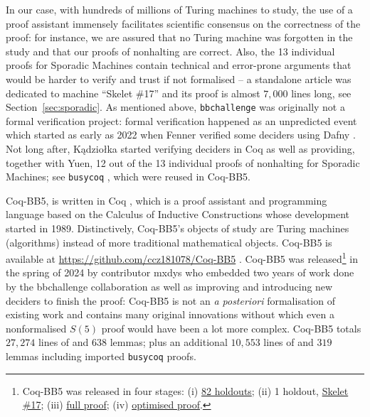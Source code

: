 \documentclass[a4paper,british]{article}
\theoremstyle{definition} %
\numberwithin{equation}{section}
\theoremstyle{definition} %
\newcommand{\CoqBB}{Coq-BB5\xspace}
\begin{document}
In our case, with hundreds of millions of Turing machines to study, the use of a proof assistant immensely facilitates scientific consensus on the correctness of the proof: for instance, we are assured that no Turing machine was forgotten in the study and that our proofs of nonhalting are correct. Also, the 13 individual proofs for Sporadic Machines contain technical and error-prone arguments that would be harder to verify and trust if not formalised -- \eg a standalone article was dedicated to machine ``Skelet \#17'' \cite{xu2024skelet17fifthbusy} and its \Coq proof is almost $7{,}000$ lines long, see Section~\ref{sec:sporadic}. As mentioned above, \texttt{bbchallenge} was originally not a formal verification project: formal verification happened as an unpredicted event which started as early as 2022 when Fenner verified some deciders using Dafny \cite{dafny_fenner, Dafny}. Not long after, Kądziołka started verifying deciders in Coq as well as providing, together with Yuen, 12 out of the 13 individual proofs of nonhalting for Sporadic Machines; see  \texttt{busycoq} \cite{busycoq}, which were reused in \CoqBB.

\CoqBB, is written in Coq \cite{the_coq_development_team_2024_14542673}, which is a proof assistant and programming language based on the Calculus of Inductive Constructions \cite{CoC} whose development started in 1989. Distinctively, \CoqBB's objects of study are Turing machines (\ie algorithms) instead of more traditional mathematical objects. \CoqBB is available at \url{https://github.com/ccz181078/Coq-BB5} \cite{mxdys_2025_17061968}. \CoqBB was released\footnote{\CoqBB was released in four stages: (i) \href{https://discuss.bbchallenge.org/t/proving-bb-5-in-coq/225}{82 holdouts}; (ii) 1 holdout, \href{https://bbchallenge.org/1RB---_0LC1RE_0LD1LC_1RA1LB_0RB0RA}{Skelet \#17}; (iii) \href{https://discuss.bbchallenge.org/t/july-2nd-2024-we-have-proved-bb-5-47-176-870/237}{full proof}; (iv) \href{https://github.com/ccz181078/Coq-BB5}{optimised proof}.} in the spring of 2024 by contributor mxdys who embedded two years of work done by the bbchallenge collaboration as well as improving and introducing new deciders to finish the proof: \CoqBB is not an \textit{a posteriori} formalisation of existing work and contains many original innovations without which even a nonformalised $S(5)$ proof would have been a lot more complex. \CoqBB totals $27{,}274$ lines of \Coq and $638$ lemmas; plus an additional $10{,}553$ lines of \Coq and $319$ lemmas including imported \texttt{busycoq} proofs.
\end{document}
